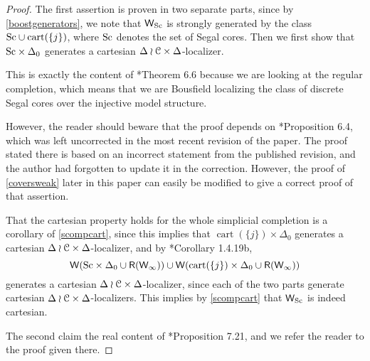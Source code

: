 \begin{proof} 
The first assertion is proven in two separate parts, since by \eqref{boostgenerators}, we note that \(\mathsf{W}_{{\operatorname{Sc}}}\) is strongly generated by the class \({\operatorname{Sc}} \cup \operatorname{cart}(\{j\})\), where \({\operatorname{Sc}}\) denotes the set of Segal cores.  Then we first show that \({\operatorname{Sc}}\times \Delta_0\) generates a cartesian \(\Delta \wr \mathcal{C} \times \Delta\)-localizer.     
 
This is exactly the content of \cite{rezk-theta-n-spaces}*{Theorem 6.6} because we are looking at the regular completion, which means that we are Bousfield localizing the class of discrete Segal cores over the injective model structure. 

However, the reader should beware that the proof depends on \cite{rezk-theta-n-spaces}*{Proposition 6.4}, which was left uncorrected in the most recent revision of the paper.  The proof stated there is based on an incorrect statement from the published revision, and the author had forgotten to update it in the correction.  However, the proof of \eqref{coversweak} later in this paper can easily be modified to give a correct proof of that assertion. 

That the cartesian property holds for the whole simplicial completion is a corollary of \eqref{scompcart}, since this implies that \(\operatorname{cart}(\{j\})\times \Delta_0\) generates a cartesian \(\Delta \wr \mathcal{C} \times \Delta\)-localizer, and by \cite{cisinski-book}*{Corollary 1.4.19b}, \[\mathsf{W}({\operatorname{Sc}}\times \Delta_0 \cup \mathsf{R}(\mathsf{W}_\infty))\cup \mathsf{W}(\operatorname{cart}(\{j\})\times \Delta_0 \cup \mathsf{R}(\mathsf{W}_\infty))\] generates a cartesian \(\Delta \wr \mathcal{C} \times \Delta\)-localizer, since each of the two parts generate cartesian \(\Delta \wr \mathcal{C} \times \Delta\)-localizers.  This implies by \eqref{scompcart} that \(\mathsf{W}_{{\operatorname{Sc}}}\) is indeed cartesian.

The second claim the real content of \cite{rezk-theta-n-spaces}*{Proposition 7.21}, and we refer the reader to the proof given there.
\end{proof}


